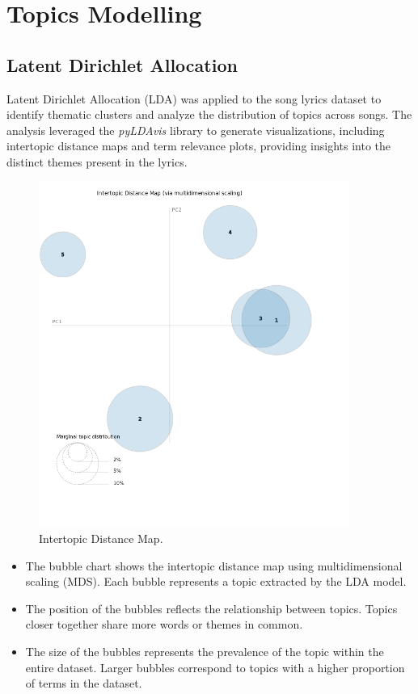 

\section{Topics Modelling}
\label{sec:topicsmodelling}

\subsection{Latent Dirichlet Allocation}

Latent Dirichlet Allocation (LDA) was applied to the song lyrics dataset to
identify thematic clusters and analyze the distribution of topics across songs.
The analysis leveraged the \textit{pyLDAvis} library to generate
visualizations, including intertopic distance maps and term relevance plots,
providing insights into the distinct themes present in the lyrics.\cite{pylda}

\begin{center}
\begin{figure}[H]
  \centering
  \includegraphics[width=4in]{img/topics/png/topics.png}
  \caption{Intertopic Distance Map.}
  \label{Figure:intertopicdistancemap}
\end{figure}
\end{center}

\begin{itemize}
  \item The bubble chart shows the intertopic distance map using multidimensional
scaling (MDS). Each bubble represents a topic extracted by the LDA model.
  \item The position of the bubbles reflects the relationship between topics.
    Topics closer together share more words or themes in common.
  \item The size of the bubbles represents the prevalence of the topic within
    the entire dataset. Larger bubbles correspond to topics with a higher
    proportion of terms in the dataset.
\end{itemize}



